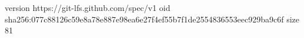 version https://git-lfs.github.com/spec/v1
oid sha256:077c88126c59e8a78e887e98ea6e27f4ef55b7f1de2554836553eec929ba9c6f
size 81
